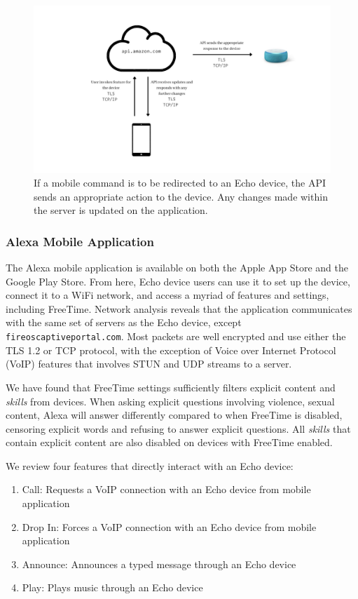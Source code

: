 \documentclass[12pt]{ucthesis}
\begin{document}
\begin{figure}
    \includegraphics[width=\textwidth]{mobile command.jpg}
    \caption{If a mobile command is to be redirected to an Echo device, the API sends an appropriate action to the device. Any changes made within the server is updated on the application.}
    \label{fig:mobilecomm}
\end{figure}

\subsubsection{Alexa Mobile Application}
The Alexa mobile application is available on both the Apple App Store and the Google Play Store. From here, Echo device users can use it to set up the device, connect it to a WiFi network, and access a myriad of features and settings, including FreeTime. Network analysis reveals that the application communicates with the same set of servers as the Echo device, except \texttt{fireoscaptiveportal.com}. Most packets are well encrypted and use either the TLS 1.2 or TCP protocol, with the exception of Voice over Internet Protocol (VoIP) features that involves STUN and UDP streams to a server.

We have found that FreeTime settings sufficiently filters explicit content and \textit{skills} from devices. When asking explicit questions involving violence, sexual content, Alexa will answer differently compared to when FreeTime is disabled, censoring explicit words and refusing to answer explicit questions. All \textit{skills} that contain explicit content are also disabled on devices with FreeTime enabled.

We review four features that directly interact with an Echo device:
\begin{enumerate}
\item Call: Requests a VoIP connection with an Echo device from mobile application
\item Drop In: Forces a VoIP connection with an Echo device from mobile application
\item Announce: Announces a typed message through an Echo device
\item Play: Plays music through an Echo device
\end{enumerate}
\end{document}
